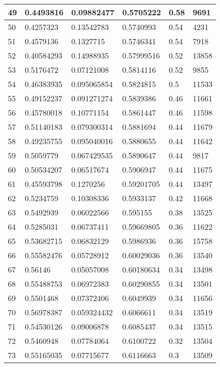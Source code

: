 \begin{longtable}{|l|l|l|l|l|l|}
49 & 0.4493816 & 0.09882477 & 0.5705222 & 0.58 & 9691 \\ \hline 
50 & 0.4257323 & 0.13542783 & 0.5740993 & 0.54 & 4231 \\ \hline 
51 & 0.4579136 & 0.1327715 & 0.5746341 & 0.54 & 7918 \\ \hline 
52 & 0.40584293 & 0.14988935 & 0.57999516 & 0.52 & 13858 \\ \hline 
53 & 0.5176472 & 0.07121008 & 0.5814116 & 0.52 & 9855 \\ \hline 
54 & 0.46383935 & 0.095065854 & 0.5824815 & 0.5 & 11533 \\ \hline 
55 & 0.49152237 & 0.091271274 & 0.5839386 & 0.46 & 11661 \\ \hline 
56 & 0.45780018 & 0.10771154 & 0.5861447 & 0.46 & 11598 \\ \hline 
57 & 0.51140183 & 0.079300314 & 0.5881694 & 0.44 & 11679 \\ \hline 
58 & 0.49235755 & 0.095040016 & 0.5880655 & 0.44 & 11642 \\ \hline 
59 & 0.5059779 & 0.067429535 & 0.5890647 & 0.44 & 9817 \\ \hline 
60 & 0.50534207 & 0.06517674 & 0.5906947 & 0.44 & 11675 \\ \hline 
61 & 0.45593798 & 0.1270256 & 0.59201705 & 0.44 & 13497 \\ \hline 
62 & 0.5234759 & 0.10308336 & 0.5933137 & 0.42 & 11668 \\ \hline 
63 & 0.5492939 & 0.06022566 & 0.595155 & 0.38 & 13525 \\ \hline 
64 & 0.5285031 & 0.06737411 & 0.59669805 & 0.36 & 11622 \\ \hline 
65 & 0.53682715 & 0.06832129 & 0.5986936 & 0.36 & 15758 \\ \hline 
66 & 0.55582476 & 0.05728912 & 0.60029036 & 0.36 & 13540 \\ \hline 
67 & 0.56146 & 0.05057008 & 0.60180634 & 0.34 & 13498 \\ \hline 
68 & 0.55488753 & 0.06972383 & 0.60290855 & 0.34 & 13501 \\ \hline 
69 & 0.5501468 & 0.07372406 & 0.6049939 & 0.34 & 11656 \\ \hline 
70 & 0.56978387 & 0.059324432 & 0.6066611 & 0.34 & 13519 \\ \hline 
71 & 0.54530126 & 0.09006878 & 0.6085437 & 0.34 & 13515 \\ \hline 
72 & 0.5460948 & 0.07784064 & 0.6100722 & 0.32 & 13504 \\ \hline 
73 & 0.55165035 & 0.07715677 & 0.6116663 & 0.3 & 13509 \\ \hline 

\end{longtable}
